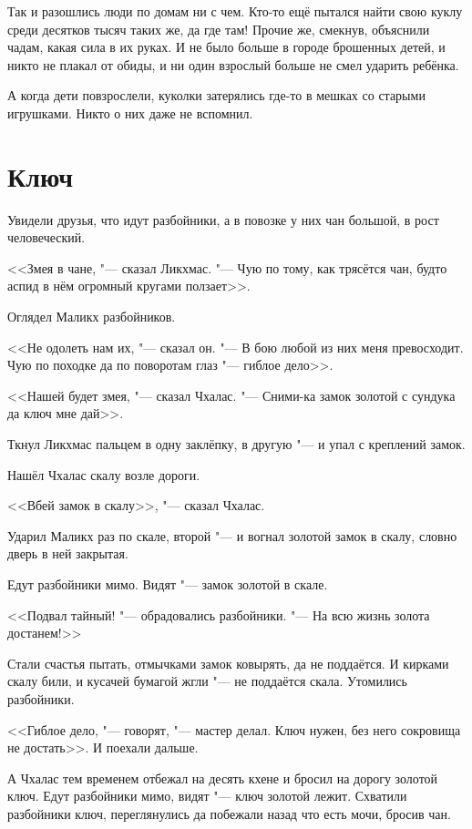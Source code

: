 Так и разошлись люди по домам ни с чем.
Кто-то ещё пытался найти свою куклу среди десятков тысяч таких же, да где там!
Прочие же, смекнув, объяснили чадам, какая сила в их руках.
И не было больше в городе брошенных детей, и никто не плакал от обиды, и ни один взрослый больше не смел ударить ребёнка.

А когда дети повзрослели, куколки затерялись где-то в мешках со старыми игрушками.
Никто о них даже не вспомнил.

\section{Ключ}

Увидели друзья, что идут разбойники, а в повозке у них чан большой, в рост человеческий.

<<Змея в чане, "--- сказал Ликхмас.
"--- Чую по тому, как трясётся чан, будто аспид в нём огромный кругами ползает>>.

Оглядел Маликх разбойников.

<<Не одолеть нам их, "--- сказал он.
"--- В бою любой из них меня превосходит.
Чую по походке да по поворотам глаз "--- гиблое дело>>.

<<Нашей будет змея, "--- сказал Чхалас.
"--- Сними-ка замок золотой с сундука да ключ мне дай>>.

Ткнул Ликхмас пальцем в одну заклёпку, в другую "--- и упал с креплений замок.

Нашёл Чхалас скалу возле дороги.

<<Вбей замок в скалу>>, "--- сказал Чхалас.

Ударил Маликх раз по скале, второй "--- и вогнал золотой замок в скалу, словно дверь в ней закрытая.

Едут разбойники мимо.
Видят "--- замок золотой в скале.

<<Подвал тайный! "--- обрадовались разбойники.
"--- На всю жизнь золота достанем!>>

Стали счастья пытать, отмычками замок ковырять, да не поддаётся.
И кирками скалу били, и кусачей бумагой жгли "--- не поддаётся скала.
Утомились разбойники.

<<Гиблое дело, "--- говорят, "--- мастер делал.
Ключ нужен, без него сокровища не достать>>.
И поехали дальше.

А Чхалас тем временем отбежал на десять кхене и бросил на дорогу золотой ключ.
Едут разбойники мимо, видят "--- ключ золотой лежит.
Схватили разбойники ключ, переглянулись да побежали назад что есть мочи, бросив чан.

